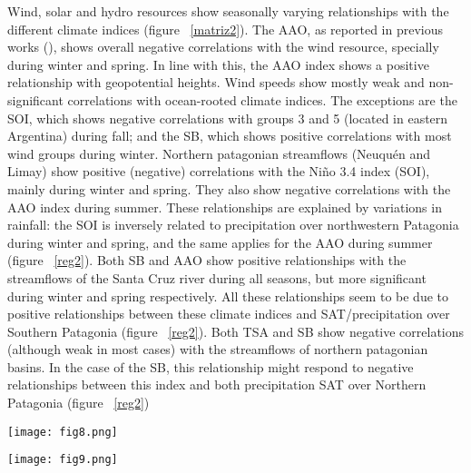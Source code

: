 \documentclass[AMA,Times1COL]{WileyNJDv5} %
\begin{document}
\begin{linenumbers}
\begin{figure}[hbpt]
\end{figure}

Wind, solar and hydro resources show seasonally varying relationships with the different climate indices (figure ~\ref{matriz2}). The AAO, as reported in previous works (\cite{bianchi2022assessing}), shows overall negative correlations with the wind resource, specially during winter and spring. In line with this, the AAO index shows a positive relationship with geopotential heights. Wind speeds show mostly weak and non-significant correlations with ocean-rooted climate indices. The exceptions are the SOI, which shows negative correlations with groups 3 and 5 (located in eastern Argentina) during fall; and the SB, which shows positive correlations with most wind groups during winter. Northern patagonian streamflows (Neuquén and Limay) show positive (negative) correlations with the Niño 3.4 index (SOI), mainly during  winter and spring. They also show negative correlations with the AAO index during summer. These relationships are explained by variations in rainfall: the SOI is inversely related to precipitation over northwestern Patagonia during winter and spring, and the same applies for the AAO during summer (figure ~\ref{reg2}). Both SB and AAO show positive relationships with the streamflows of the Santa Cruz river during all seasons, but more significant during winter and spring respectively. All these relationships seem to be due to positive relationships between these climate indices and SAT/precipitation over Southern Patagonia (figure ~\ref{reg2}). Both TSA and SB show negative correlations (although weak in most cases) with the streamflows of northern patagonian basins. In the case of the SB, this relationship might respond to negative relationships between this index and both precipitation SAT over Northern Patagonia (figure ~\ref{reg2})

\begin{figure*}[hbpt]
	\centering
	\hspace*{-1cm}   
	\texttt{[image: fig8.png]}
	\caption{\label{matriz2} Correlation matrices between three-monthy (seasonal) mean climate indices and solar, wind and hydro time series.}
\end{figure*}

\begin{figure*}[hbpt]
	\centering
	\hspace*{-1cm}   
	\texttt{[image: fig9.png]}
	\caption{\label{reg2} 925 mb geopotential heights (contours: red contours indicate positive geopotential values, blue contours indicate negative geopotential values), precipitation (left pannels) and SAT (right pannels) regressed upon AAO, SOI, SB and PDO indices during all seasons. Blue dots indicate the location of wind sites. Black triangles indicate the location of streamflow measurement gauges. Elevations above 1500 m.a.s.l. are masked.}
\end{figure*}


\end{linenumbers}
\end{document}
